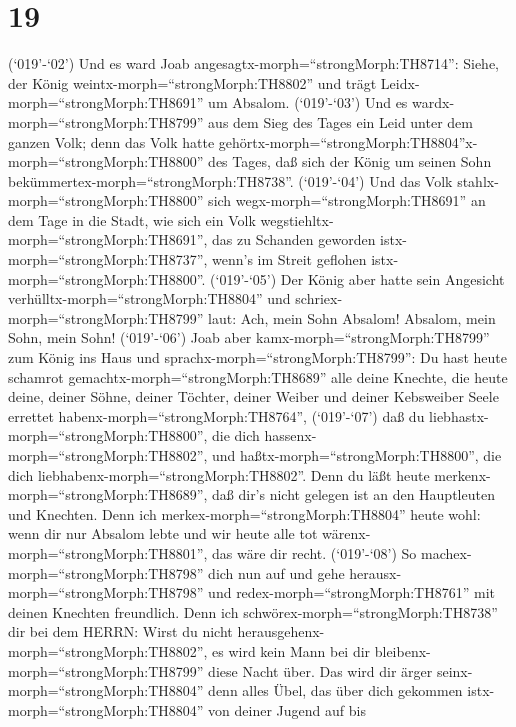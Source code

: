 \hypertarget{section-18}{%
\section{19}\label{section-18}}

 (`019'-`02') Und es ward Joab
angesagtx-morph=``strongMorph:TH8714'': Siehe, der König
weintx-morph=``strongMorph:TH8802'' und trägt
Leidx-morph=``strongMorph:TH8691'' um Absalom.  (`019'-`03')
Und es wardx-morph=``strongMorph:TH8799'' aus dem Sieg des Tages ein
Leid unter dem ganzen Volk; denn das Volk hatte
gehörtx-morph=``strongMorph:TH8804''x-morph=``strongMorph:TH8800'' des
Tages, daß sich der König um seinen Sohn
bekümmertex-morph=``strongMorph:TH8738''.  (`019'-`04') Und
das Volk stahlx-morph=``strongMorph:TH8800'' sich
wegx-morph=``strongMorph:TH8691'' an dem Tage in die Stadt, wie sich ein
Volk wegstiehltx-morph=``strongMorph:TH8691'', das zu Schanden geworden
istx-morph=``strongMorph:TH8737'', wenn's im Streit geflohen
istx-morph=``strongMorph:TH8800''.  (`019'-`05') Der König
aber hatte sein Angesicht verhülltx-morph=``strongMorph:TH8804'' und
schriex-morph=``strongMorph:TH8799'' laut: Ach, mein Sohn Absalom!
Absalom, mein Sohn, mein Sohn!  (`019'-`06') Joab aber
kamx-morph=``strongMorph:TH8799'' zum König ins Haus und
sprachx-morph=``strongMorph:TH8799'': Du hast heute schamrot
gemachtx-morph=``strongMorph:TH8689'' alle deine Knechte, die heute
deine, deiner Söhne, deiner Töchter, deiner Weiber und deiner Kebsweiber
Seele errettet habenx-morph=``strongMorph:TH8764'', 
(`019'-`07') daß du liebhastx-morph=``strongMorph:TH8800'', die dich
hassenx-morph=``strongMorph:TH8802'', und
haßtx-morph=``strongMorph:TH8800'', die dich
liebhabenx-morph=``strongMorph:TH8802''. Denn du läßt heute
merkenx-morph=``strongMorph:TH8689'', daß dir's nicht gelegen ist an den
Hauptleuten und Knechten. Denn ich merkex-morph=``strongMorph:TH8804''
heute wohl: wenn dir nur Absalom lebte und wir heute alle tot
wärenx-morph=``strongMorph:TH8801'', das wäre dir recht. 
(`019'-`08') So machex-morph=``strongMorph:TH8798'' dich nun auf und
gehe herausx-morph=``strongMorph:TH8798'' und
redex-morph=``strongMorph:TH8761'' mit deinen Knechten freundlich. Denn
ich schwörex-morph=``strongMorph:TH8738'' dir bei dem HERRN: Wirst du
nicht herausgehenx-morph=``strongMorph:TH8802'', es wird kein Mann bei
dir bleibenx-morph=``strongMorph:TH8799'' diese Nacht über. Das wird dir
ärger seinx-morph=``strongMorph:TH8804'' denn alles Übel, das über dich
gekommen istx-morph=``strongMorph:TH8804'' von deiner Jugend auf bis
